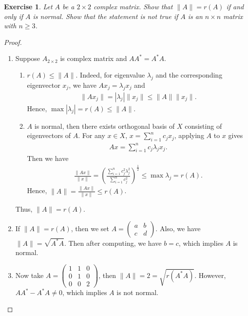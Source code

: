\documentclass[11pt]{book}
\newtheorem{exercise}{Exercise}[section]
\theoremstyle{definition}
\numberwithin{equation}{chapter}
\begin{document}
\begin{exercise}
Let $A$ be a $2\times 2$ complex matrix. Show that $\|A\| = r(A)$ if and only if $A$ is normal. Show that the statement is not true if $A$ is an $n\times n$ matrix with $n \geq 3$.
\end{exercise}
\begin{proof}
~\begin{enumerate}[label=(\alph*)]
    \item Suppose $A_{2\times 2}$ is complex matrix and $AA^* = A^* A$.
    \begin{enumerate}[label=\arabic*)]
        \item $r(A) \leq \|A\|$. Indeed, for eigenvalue $\lambda_j$ and the corresponding eigenvector $x_j$, we have $Ax_j = \lambda_j x_j$ and 
        \begin{align*}
            \|Ax_j\| = \left|\lambda_j\right| \|x_j\| \leq \|A\| \|x_j\|.
        \end{align*}
        Hence, $\max|\lambda_j| = r(A) \leq \|A\|$.
        
        \item $A$ is normal, then there exists orthogonal basis of $X$ consisting of eigenvectors of $A$. For any $x\in X$, $x = \sum^n_{i=1} c_j x_j$, applying $A$ to $x$ gives
        \begin{align*}
            Ax = \sum^n_{i=1} c_j \lambda_j x_j.
        \end{align*}
        Then we have
        \begin{align*}
            \frac{\|Ax\|}{\|x\|} = \left(\frac{\sum^n_{i=1} c_j^2 \lambda_j^2 }{\sum^n_{i=1} c_j^2}\right)^{\frac{1}{2}} \leq \max \lambda_j = r(A).
        \end{align*}
        Hence, $\|A\| = \frac{\|Ax\|}{\|x\|} \leq r(A)$.
    \end{enumerate}
    Thus, $\|A\| = r(A)$.
    
    \item If $\|A\| = r(A)$, then we set $A = \begin{pmatrix}  
        a & b \\
        c & d
    \end{pmatrix}$. Also, we have $\|A\| = \sqrt{A^*A}$. Then after computing, we have $b = c$, which implies $A$ is normal.
    
    \item Now take $A = \begin{pmatrix} 
        1 & 1 & 0 \\
        0 & 1 & 0 \\
        0 & 0 & 2
    \end{pmatrix}$, then $\|A\| = 2 = \sqrt{r(A^* A)}$. However, $AA^* - A^* A \neq 0$, which implies $A$ is not normal. 
\end{enumerate}
\end{proof}
\end{document}
